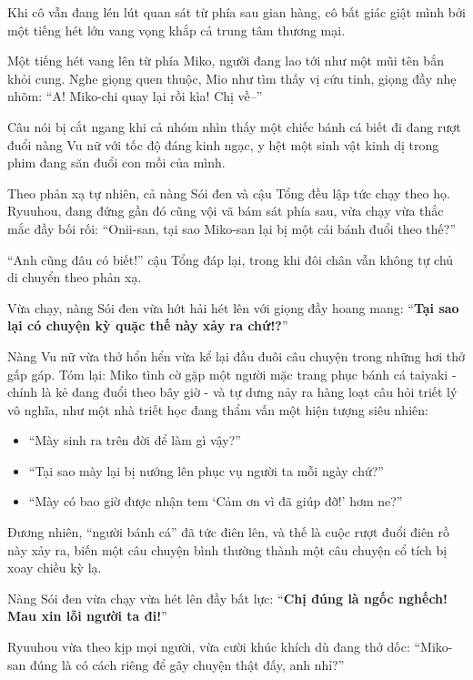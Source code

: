 \documentclass[../main.tex]{subfiles}
\begin{document}
Khi cô vẫn đang lén lút quan sát từ phía sau gian hàng, cô bất giác giật mình bởi một tiếng hét lớn vang vọng khắp cả trung tâm thương mại.

\il

Một tiếng hét vang lên từ phía Miko, người đang lao tới như một mũi tên bắn khỏi cung. Nghe giọng quen thuộc, Mio như tìm thấy vị cứu tinh, giọng đầy nhẹ nhõm: ``A! Miko-chi quay lại rồi kìa! Chị về--''

Câu nói bị cắt ngang khi cả nhóm nhìn thấy một chiếc bánh cá biết đi đang rượt đuổi nàng Vu nữ với tốc độ đáng kinh ngạc, y hệt một sinh vật kinh dị trong phim đang săn đuổi con mồi của mình.


Theo phản xạ tự nhiên, cả nàng Sói đen và cậu Tổng đều lập tức chạy theo họ. Ryuuhou, đang đứng gần đó cũng vội vã bám sát phía sau, vừa chạy vừa thắc mắc đầy bối rối: ``Onii-san, tại sao Miko-san lại bị một cái bánh đuổi theo thế?''

``Anh cũng đâu có biết!'' cậu Tổng đáp lại, trong khi đôi chân vẫn không tự chủ di chuyển theo phản xạ.

Vừa chạy, nàng Sói đen vừa hớt hải hét lên với giọng đầy hoang mang: ``\textbf{Tại sao lại có chuyện kỳ quặc thế này xảy ra chứ!?}''

Nàng Vu nữ vừa thở hổn hển vừa kể lại đầu đuôi câu chuyện trong những hơi thở gấp gáp. Tóm lại: Miko tình cờ gặp một người mặc trang phục bánh cá taiyaki - chính là kẻ đang đuổi theo bây giờ - và tự dưng nảy ra hàng loạt câu hỏi triết lý vô nghĩa, như một nhà triết học đang thẩm vấn một hiện tượng siêu nhiên:

\begin{itemize}
  \item ``Mày sinh ra trên đời để làm gì vậy?''
  \item ``Tại sao mày lại bị nướng lên phục vụ người ta mỗi ngày chứ?''
  \item ``Mày có bao giờ được nhận tem `Cảm ơn vì đã giúp đỡ!' hơm ne?''
\end{itemize}

Đương nhiên, ``người bánh cá'' đã tức điên lên, và thế là cuộc rượt đuổi điên rồ này xảy ra, biến một câu chuyện bình thường thành một câu chuyện cổ tích bị xoay chiều kỳ lạ.

Nàng Sói đen vừa chạy vừa hét lên đầy bất lực: ``\textbf{Chị đúng là ngốc nghếch! Mau xin lỗi người ta đi!}''

Ryuuhou vừa theo kịp mọi người, vừa cười khúc khích dù đang thở dốc: ``Miko-san đúng là có cách riêng để gây chuyện thật đấy, anh nhỉ?''
\end{document}
